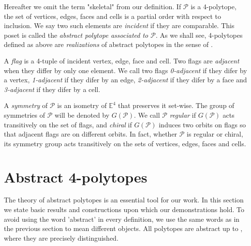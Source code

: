 \documentclass{article}
\theoremstyle{definition}
\newcommand{\E}{\mathbb{E}}
\newcommand{\p}{\mathcal{P}}
\begin{document}
	Hereafter we omit the term "skeletal" from our definition. If $\p$ is a 4-polytope, the set of vertices, edges, faces and cells is a partial order with respect to inclusion. We say two such elements are \textit{incident} if they are comparable. This poset is called the \textit{abstract polytope associated to $\p$}. As we shall see, 4-polytopes defined as above are \textit{realizations} of abstract polytopes in the sense of .
	
	A \textit{flag} is a 4-tuple of incident vertex, edge, face and cell. Two flags are \textit{adjacent} when they differ by only one element. We call two flags \textit{0-adjacent} if they difer by a vertex, \textit{1-adjacent} if they difer by an edge, \textit{2-adjacent} if they difer by a face and \textit{3-adjacent} if they difer by a cell.
	
	A \textit{symmetry} of $\p$ is an isometry of $\E^4$ that preserves it set-wise. The group of symmetries of $\p$ will be denoted by $G(\p)$. We call $\p$ \textit{regular} if $G(\p)$ acts transitively on the set of flags, and \textit{chiral} if $G(\p)$ induces two orbits on flags so that adjacent flags are on different orbits. In fact, whether $\p$ is regular or chiral, its symmetry group acts transitively on the sets of vertices, edges, faces and cells.
	

	
\section{Abstract 4-polytopes}\label{sec:abstract-defs}
	The theory of abstract polytopes is an essential tool for our work. In this section we state basic results and constructions upon which our demonstrations hold. To avoid using the word 'abstract' in every definition, we use the same words as in the previous section to mean different objects. All polytopes are abstract up to , where they are precisely distinguished.
	
\end{document}
